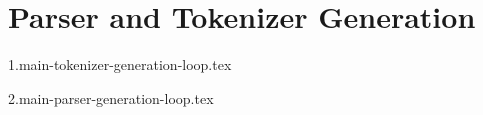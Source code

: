 
\section{Parser and Tokenizer Generation}
{
	\lipsum[1]
	
	{1.main-tokenizer-generation-loop.tex}
	
	{2.main-parser-generation-loop.tex}
}

